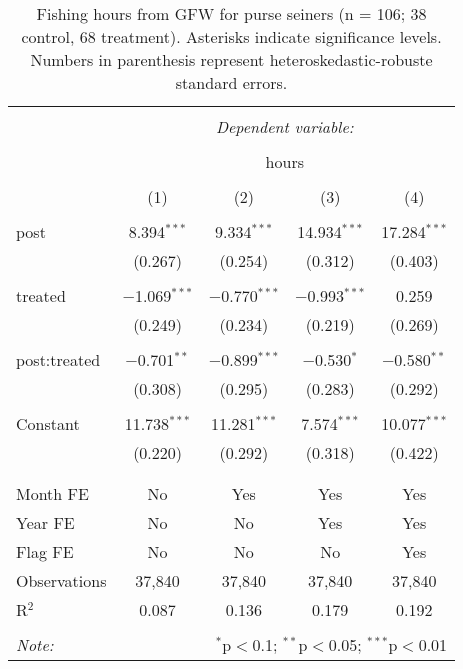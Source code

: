 \documentclass[12pt,]{article}
\begin{document}
\begin{table}[!htbp] \centering 
  \caption{\label{tab:purse_old}Fishing hours from GFW for purse seiners (n = 106; 38 control, 68 treatment). Asterisks indicate significance levels. Numbers in parenthesis represent heteroskedastic-robuste standard errors.} 
  \label{} 
\begin{tabular}{@{\extracolsep{5pt}}lcccc} 
\\[-1.8ex]\hline 
\hline \\[-1.8ex] 
 & \multicolumn{4}{c}{\textit{Dependent variable:}} \\ 
\cline{2-5} 
\\[-1.8ex] & \multicolumn{4}{c}{hours} \\ 
\\[-1.8ex] & (1) & (2) & (3) & (4)\\ 
\hline \\[-1.8ex] 
 post & 8.394$^{***}$ & 9.334$^{***}$ & 14.934$^{***}$ & 17.284$^{***}$ \\ 
  & (0.267) & (0.254) & (0.312) & (0.403) \\ 
  & & & & \\ 
 treated & $-$1.069$^{***}$ & $-$0.770$^{***}$ & $-$0.993$^{***}$ & 0.259 \\ 
  & (0.249) & (0.234) & (0.219) & (0.269) \\ 
  & & & & \\ 
 post:treated & $-$0.701$^{**}$ & $-$0.899$^{***}$ & $-$0.530$^{*}$ & $-$0.580$^{**}$ \\ 
  & (0.308) & (0.295) & (0.283) & (0.292) \\ 
  & & & & \\ 
 Constant & 11.738$^{***}$ & 11.281$^{***}$ & 7.574$^{***}$ & 10.077$^{***}$ \\ 
  & (0.220) & (0.292) & (0.318) & (0.422) \\ 
  & & & & \\ 
\hline \\[-1.8ex] 
Month FE & No & Yes & Yes & Yes \\ 
Year FE & No & No & Yes & Yes \\ 
Flag FE & No & No & No & Yes \\ 
Observations & 37,840 & 37,840 & 37,840 & 37,840 \\ 
R$^{2}$ & 0.087 & 0.136 & 0.179 & 0.192 \\ 
\hline 
\hline \\[-1.8ex] 
\textit{Note:}  & \multicolumn{4}{r}{$^{*}$p$<$0.1; $^{**}$p$<$0.05; $^{***}$p$<$0.01} \\ 
\end{tabular} 
\end{table}
\end{document}
